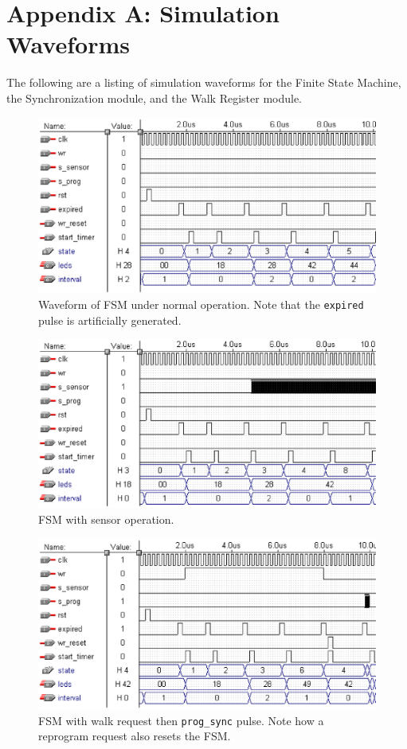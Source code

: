 \documentclass{article}
\begin{document}
\newpage
\section{Appendix A: Simulation Waveforms}
	The following are a listing of simulation waveforms for the Finite State
	Machine, the Synchronization module, and the Walk Register module.

	\begin{figure}[h]
	\centering
	\includegraphics[scale=0.40]{sim1.ps}
	\caption{Waveform of FSM under normal operation.  Note that the \texttt{expired} pulse is artificially generated.}
	\label{fig:sim1}
	\end{figure}

	\begin{figure}[h]
	\centering
	\includegraphics[scale=0.40]{sim2.ps}
	\caption{FSM with sensor operation.}
	\label{fig:sim2}
	\end{figure}

	\begin{figure}[h]
	\centering
	\includegraphics[scale=0.40]{sim3.ps}
	\caption{FSM with walk request then \texttt{prog\_sync} pulse.  Note how a reprogram request also resets the FSM.}
	\label{fig:sim3}
	\end{figure}
\end{document}
